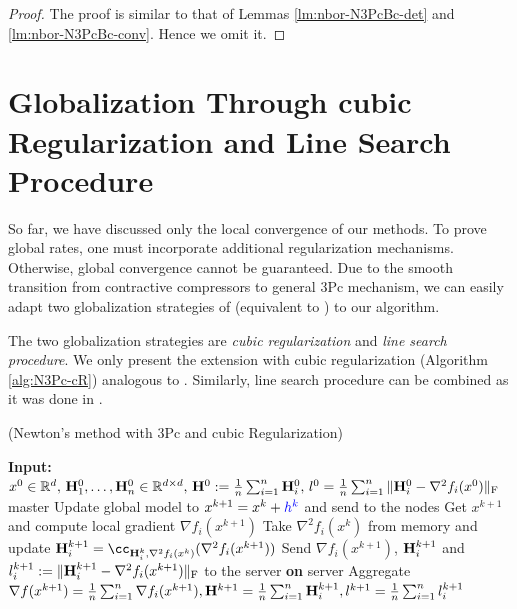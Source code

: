 \documentclass[11pt]{article}
\begin{document}
	\begin{proof}
		
		The proof is similar to that of  Lemmas \ref{lm:nbor-N3PcBc-det} and \ref{lm:nbor-N3PcBc-conv}. Hence we omit it. 
		
	\end{proof}
	
	
	
	
	
	
	\section{Globalization Through cubic Regularization and Line Search Procedure}
	
	So far, we have discussed only the local convergence of our methods. To prove global rates, one must incorporate additional regularization mechanisms. Otherwise, global convergence cannot be guaranteed.
	Due to the smooth transition from contractive compressors to general 3Pc mechanism, we can easily adapt two globalization strategies of  (equivalent to ) to our  algorithm.
	
	The two globalization strategies are {\em cubic regularization} and {\em line search procedure}. We only present the extension with cubic regularization  (Algorithm \ref{alg:N3Pc-cR}) analogous to  \citep{FedNL2021}. Similarly, line search procedure can be combined as it was done in  \citep{FedNL2021}.
	
	\begin{algorithm}[H]
		\caption{ (Newton's method with 3Pc and {\color{blue}cubic Regularization})}
		\label{alg:N3Pc-cR}
		\begin{algorithmic}[1]
			\STATE \textbf{Input:} $x^0\in\mathbb{R}^d,\, \mathbf{H}_1^0, \dots, \mathbf{H}_n^0 \in \mathbb{R}^{d\times d},\, \mathbf{H}^0 \; { := }\; \frac{1}{n}\sum_{i=1}^n \mathbf{H}_i^0,\, l^0 = \frac{1}{n}\sum_{i=1}^n \|\mathbf{H}_i^0 - \nabla^2 f_i(x^0)\|_{\rm F}$
			 master
			\STATE {}
			\STATE \quad Update global model to $x^{k+1} = x^k + {\color{blue}h^k}$ and send to the nodes
			\STATE Get $x^{k+1}$ and compute local gradient $\nabla f_i(x^{k+1})$ %
			\STATE Take $\nabla^2f_i(x^k)$ from memory and update $\mH^{k+1}_i = \cc_{\mH_i^k, \nabla^2f_i(x^k)}(\nabla^2f_i(x^{k+1}))$
			\STATE Send $\nabla f_i(x^{k+1})$,\; $\mathbf{H}^{k+1}_i$ and $l_i^{k+1} \; { := }\; \|\mathbf{H}_i^{k+1} - \nabla^2 f_i(x^{k+1})\|_{\rm F}$ to the server
			\ENDFOR
			\STATE \textbf{on} server
			\STATE \quad Aggregate $ \nabla f(x^{k+1}) = \frac{1}{n}\sum_{i=1}^n \nabla f_i(x^{k+1}), \mathbf{H}^{k+1} = \frac{1}{n}\sum_{i=1}^n\mathbf{H}_i^{k+1}, l^{k+1} = \frac{1}{n}\sum_{i=1}^n l_i^{k+1}$
		\end{algorithmic}
	\end{algorithm}
	
\end{document}

